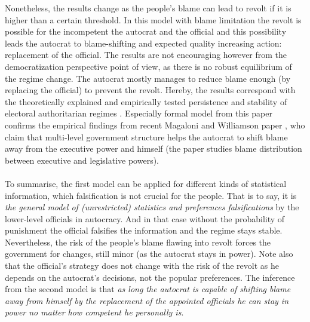 \documentclass[a4paper, 12pt]{article}
\begin{document}
	Nonetheless, the results change as the people's blame can lead to revolt if it is higher than a certain threshold. In this model with blame limitation the revolt is possible for the incompetent the autocrat and the official and this possibility leads the autocrat to blame-shifting and expected quality increasing action: replacement of the official. The results are not encouraging however from the democratization perspective point of view, as there is no robust equilibrium of the regime change. The autocrat mostly manages to reduce blame enough (by replacing the official) to prevent the revolt. Hereby, the results correspond with the theoretically explained and empirically tested persistence and stability of electoral authoritarian regimes \parencite{newway, institutions}. Especially formal model from this paper confirms the empirical findings from recent Magaloni and Williamson paper \parencite{legislaturesandblame}, who claim that multi-level government structure helps the autocrat to shift blame away from the executive power and himself (the paper studies blame distribution between executive and legislative powers).\\\\
	To summarise, the first model can be applied for different kinds of statistical information, which falsification is not crucial for the people. That is to say, it is \textit{the general model of (unrestricted) statistics and preferences falsifications} by the lower-level officials in autocracy. And in that case without the probability of punishment the official falsifies the information and the regime stays stable. Nevertheless, the risk of the people's blame flawing into revolt forces the government for changes, still minor (as the autocrat stays in power). Note also that the official's strategy does not change with the risk of the revolt as he depends on the autocrat's decisions, not the popular preferences. The inference from the second model is that \textit{as long the autocrat is capable of shifting blame away from himself by the replacement of the appointed officials he can stay in power no matter how competent he personally is}.
	\\\\
\end{document}
